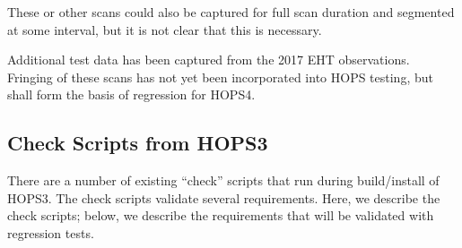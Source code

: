 
These or other scans could also be captured for full scan duration and
segmented at some interval, but it is not clear that this is necessary.

Additional test data has been captured from the 2017 \ac{EHT} observations.  Fringing of these scans has not yet been incorporated into HOPS testing, but shall form the basis of regression for HOPS4.


\subsection{Check Scripts from HOPS3}
\label{sec:regresscheck}


There are a number of existing ``check'' scripts that run during build/install of HOPS3. The check scripts validate several requirements. Here, we describe the check scripts; below, we describe the requirements that will be validated with regression tests.


